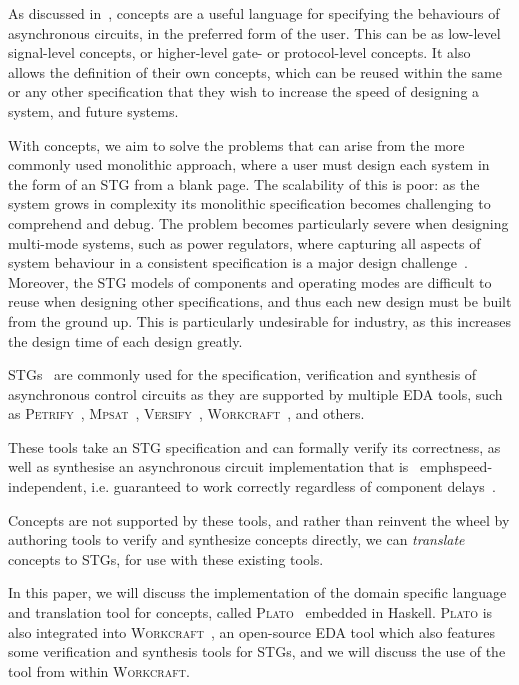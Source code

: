 \documentclass[british,conference,compsoc]{IEEEtran}
\newcommand{\noun}[1]{\textsc{#1}}
\begin{document}
As discussed in~\cite{2015_Beaumont_MEMOCODE}, concepts are a useful language 
for specifying the behaviours of asynchronous circuits, in the preferred form 
of the user. This can be as low-level signal-level concepts, or higher-level 
gate- or protocol-level concepts. It also allows the definition of their own 
concepts, which can be reused within the same or any other specification that 
they wish to increase the speed of designing a system, and future systems. 

With concepts, we aim to solve the problems that can arise from the more 
commonly used monolithic approach, where a user must design each system in the 
form of an STG from a blank page. The scalability of this is poor: as the 
system grows in complexity its monolithic specification becomes challenging to 
comprehend and debug. The problem becomes particularly severe when designing 
multi-mode systems, such as power regulators, where capturing all aspects of 
system behaviour in a consistent specification is a major design 
challenge~\cite{2014_sokolov_ftfc}\cite{sokolov2015design}. 
Moreover, the STG models of components and operating modes are difficult to 
reuse when designing other specifications, and thus each new design must be 
built from the ground up. This is particularly undesirable for industry, as 
this increases the design time of each design greatly. 

STGs~\cite{Chu_1987_phd}\cite{Rosenblum_1985_tpn} are commonly used for the 
specification, verification and synthesis of asynchronous control circuits as 
they are supported by multiple EDA tools, such as 
\noun{Petrify}~\cite{Cortadella}, \noun{Mpsat}~\cite{khomenko2004detecting}, 
\noun{Versify}~\cite{i1997formal}, 
\noun{Workcraft}~\cite{2007_poliakov_workcraft}\cite{Workcraft_website}, 
and others.

These tools take an STG specification and can formally verify its correctness, 
as well as synthesise an asynchronous circuit implementation that is \
emph{speed-independent}, i.e. guaranteed to work correctly regardless of 
component delays~\cite{Muller_1959_ts}.

Concepts are not supported by these tools, and rather than reinvent the wheel by
authoring tools to verify and synthesize concepts directly, we can 
\emph{translate} concepts to STGs, for use with these existing tools.

In this paper, we will discuss the implementation of the domain specific 
language and translation tool for concepts, called 
\noun{Plato}~\cite{2016_concepts_github} embedded in Haskell. \noun{Plato} is 
also integrated into \noun{Workcraft}~\cite{Workcraft_website}, an open-source 
EDA tool which also features some verification and synthesis tools for STGs, 
and we will discuss the use of the tool from within \noun{Workcraft}.
\end{document}
